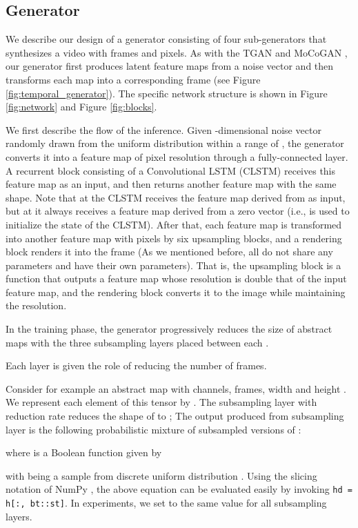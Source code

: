\documentclass[twocolumn]{svjour3}
\def\Fig#1{Figure \ref{fig:#1}}
\begin{document}
\subsection{Generator}
\label{sec:generator_architecture}
We describe our design of a generator consisting of four sub-generators that synthesizes a video with  frames and  pixels.
As with the TGAN \cite{Saito2017} and MoCoGAN \cite{Tulyakov2018},
our generator first produces  latent feature maps from a noise vector and then transforms each map into a corresponding frame (see \Fig{temporal_generator}).
The specific network structure is shown in \Fig{network} and \Fig{blocks}.

We first describe the flow of the inference. Given -dimensional noise vector
 randomly drawn from the uniform distribution within a range of ,
the generator converts it into a feature map of  pixel resolution through a fully-connected layer.
A recurrent block consisting of a Convolutional LSTM \cite{Shi2015} (CLSTM) receives this feature map as an input,
and then returns another feature map with the same shape.
Note that at  the CLSTM receives the feature map derived from  as input,
but at  it always receives a feature map derived from a zero vector
(i.e.,  is used to initialize the state of the CLSTM).
After that, each feature map is transformed into another feature map with  pixels by six upsampling blocks, and a rendering block renders it into the frame
(As we mentioned before, all  do not share any parameters and have their own parameters).
That is, the upsampling block is a function that outputs a feature map whose resolution is double that of the input feature map, and the rendering block converts it to the image while maintaining the resolution.

In the training phase, the generator progressively reduces the size of abstract maps
with the three subsampling layers placed between each .

Each layer is given the role of reducing the number of frames.

Consider for example an abstract map  with  channels,
 frames, width  and height .
We represent each element of this tensor by .
The subsampling layer with reduction rate  reduces the shape of  to
; The output  produced from subsampling layer is the following probabilistic mixture of subsampled versions of :

where  is a Boolean function given by

with  being a sample from discrete uniform distribution  .
Using the slicing notation of NumPy \cite{Oliphant2015}, the above equation can be evaluated easily by invoking \texttt{hd = h[:, bt::st]}.
In experiments, we set  to the same value for all subsampling layers.
\end{document}

